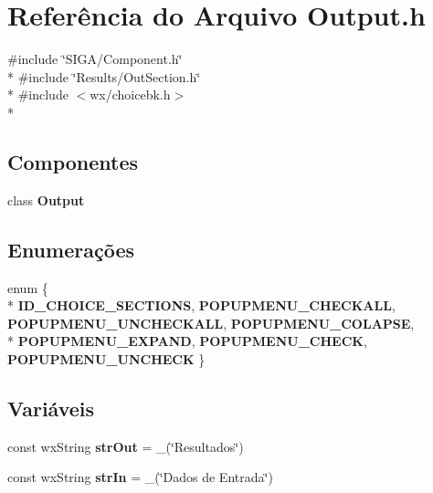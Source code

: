 \section{Referência do Arquivo Output.\+h}
\label{_output_8h}
{\ttfamily \#include \char`\"{}S\+I\+G\+A/\+Component.\+h\char`\"{}}\\*
{\ttfamily \#include \char`\"{}Results/\+Out\+Section.\+h\char`\"{}}\\*
{\ttfamily \#include $<$wx/choicebk.\+h$>$}\\*
\subsection*{Componentes}
\begin{DoxyCompactItemize}
\item 
class {\bf Output}
\end{DoxyCompactItemize}
\subsection*{Enumerações}
\begin{DoxyCompactItemize}
\item 
enum \{ \\*
{\bf I\+D\+\_\+\+C\+H\+O\+I\+C\+E\+\_\+\+S\+E\+C\+T\+I\+O\+NS}, 
{\bf P\+O\+P\+U\+P\+M\+E\+N\+U\+\_\+\+C\+H\+E\+C\+K\+A\+LL}, 
{\bf P\+O\+P\+U\+P\+M\+E\+N\+U\+\_\+\+U\+N\+C\+H\+E\+C\+K\+A\+LL}, 
{\bf P\+O\+P\+U\+P\+M\+E\+N\+U\+\_\+\+C\+O\+L\+A\+P\+SE}, 
\\*
{\bf P\+O\+P\+U\+P\+M\+E\+N\+U\+\_\+\+E\+X\+P\+A\+ND}, 
{\bf P\+O\+P\+U\+P\+M\+E\+N\+U\+\_\+\+C\+H\+E\+CK}, 
{\bf P\+O\+P\+U\+P\+M\+E\+N\+U\+\_\+\+U\+N\+C\+H\+E\+CK}
 \}
\end{DoxyCompactItemize}
\subsection*{Variáveis}
\begin{DoxyCompactItemize}
\item 
const wx\+String {\bf str\+Out} = \+\_\+(\char`\"{}Resultados\char`\"{})
\item 
const wx\+String {\bf str\+In} = \+\_\+(\char`\"{}Dados de Entrada\char`\"{})
\end{DoxyCompactItemize}
